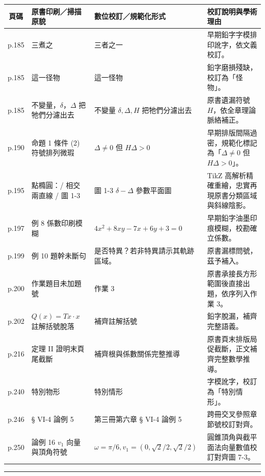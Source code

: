 \documentclass[a4paper,12pt,twoside]{article}
\begin{document}
\begin{table}[htbp]
\centering
\small
\begin{tabularx}{\textwidth}{|c|p{4.2cm}|p{4.5cm}|X|}
\hline
\textbf{頁碼} & \textbf{原書印刷／掃描原貌} & \textbf{數位校訂／規範化形式} & \textbf{校訂說明與學術理由} \\ \hline
p.185 & 三煮之 & 三者之一 & 早期鉛字字模排印訛字，依文義校訂。 \\ \hline
p.185 & 這一径物 & 這一怪物 & 鉛字磨損殘缺，校訂為「怪物」。 \\ \hline
p.185 & 不變量，$\delta$，$\Delta$ 把牠們分濾出去 & 不變量 $\delta, \Delta, H$ 把牠們分濾出去 & 原書遺漏符號 $H$，依全章理論脈絡補正。 \\ \hline
p.190 & 命題 1 條件 (2) 符號排列微瑕 & $\Delta \ne 0$ 但 $H\Delta > 0$ & 早期排版間隔過密，規範化標記為「$\Delta \ne 0$ 但 $H\Delta > 0$」。 \\ \hline
p.195 & 點橢圓：/ 相交兩直線 / 圖 1-3 & 圖 1-3 $\delta-\Delta$ 參數平面圖 & TikZ 高解析精確重繪，忠實再現原書分類區域與斜線陰影。 \\ \hline
p.197 & 例 8 係數印刷模糊 & $4x^2 + 8xy - 7x + 6y + 3 = 0$ & 早期鉛字油墨印痕模糊，校勘確立係數。 \\ \hline
p.199 & 例 10 題幹未斷句 & 是否特異？若非特異請示其軌跡區域。 & 原書漏標問號，茲予補入。 \\ \hline
p.200 & 作業題目未加題號 & 作業 3 & 原書承接長方形範圍後直接出題，依序列入作業 3。 \\ \hline
p.202 & $Q(x) = Tx \cdot x$ 註解括號脫落 & 補齊註解括號 & 鉛字脫漏，補齊完整語義。 \\ \hline
p.216 & 定理 II 證明末頁尾截斷 & 補齊根與係數關係完整推導 & 原書頁末排版局促截斷，正文補齊完整數學推導。 \\ \hline
p.240 & 特別物形 & 特別情形 & 字模訛字，校訂為「特別情形」。 \\ \hline
p.246 & § VI-4 論例 5 & 第三冊第六章 § VI-4 論例 5 & 跨冊交叉參照章節號校訂對齊。 \\ \hline
p.250 & 論例 16 $v_1$ 向量與頂角符號 & $\omega = \pi/6, v_1 = (0, \sqrt{2}/2, \sqrt{2}/2)$ & 圓錐頂角與截平面法向量數值校訂對齊圖 7-3。 \\ \hline
\end{tabularx}
\end{table}

\vspace{1em}
\hrule
\vspace{1em}

\tableofcontents
\newpage


\end{document}
